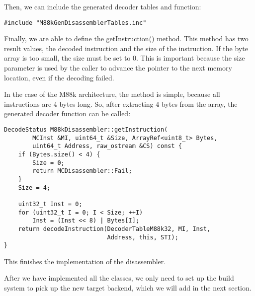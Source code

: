 Then, we can include the generated decoder tables and function:\par

\begin{lstlisting}[caption={}]
#include "M88kGenDisassemblerTables.inc"
\end{lstlisting}

Finally, we are able to define the getInstruction() method. This method has two result values, the decoded instruction and the size of the instruction. If the byte array is too small, the size must be set to 0. This is important because the size parameter is used by the caller to advance the pointer to the next memory location, even if the decoding failed.\par

In the case of the M88k architecture, the method is simple, because all instructions are 4 bytes long. So, after extracting 4 bytes from the array, the generated decoder function can be called:\par

\begin{lstlisting}[caption={}]
DecodeStatus M88kDisassembler::getInstruction(
		MCInst &MI, uint64_t &Size, ArrayRef<uint8_t> Bytes,
		uint64_t Address, raw_ostream &CS) const {
	if (Bytes.size() < 4) {
		Size = 0;
		return MCDisassembler::Fail;
	}
	Size = 4;
	
	uint32_t Inst = 0;
	for (uint32_t I = 0; I < Size; ++I)
		Inst = (Inst << 8) | Bytes[I];
	return decodeInstruction(DecoderTableM88k32, MI, Inst,
							 Address, this, STI);
}
\end{lstlisting}

This finishes the implementation of the disassembler.\par

After we have implemented all the classes, we only need to set up the build system to pick up the new target backend, which we will add in the next section.\par





























